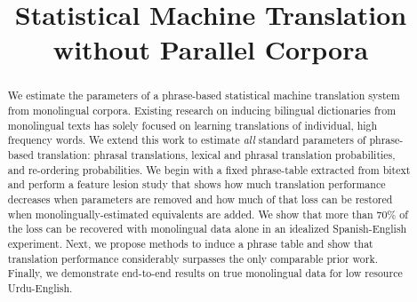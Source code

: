 \documentclass[11pt]{article}
\title{Statistical Machine Translation without Parallel Corpora}
\author{}
\date{}
\begin{document}
\maketitle
\begin{abstract}
We estimate the parameters of a phrase-based statistical machine translation system from monolingual corpora.  Existing research on inducing bilingual dictionaries from monolingual texts has solely focused on learning translations of individual, high frequency words.   We extend this work to estimate {\em all} standard parameters of phrase-based translation: phrasal translations, lexical and phrasal translation probabilities, and re-ordering probabilities.  We begin with a fixed phrase-table extracted from bitext and perform a feature lesion study that shows how much translation performance decreases when parameters are removed and how much of that loss can be restored when monolingually-estimated equivalents are added.  We show that more than 70\% of the loss can be recovered with monolingual data alone in an idealized Spanish-English experiment.  Next, we propose methods to induce a phrase table and show that translation performance considerably surpasses the only comparable prior work.  Finally, we demonstrate end-to-end results on true monolingual data for low resource Urdu-English.




\end{abstract}
\end{document}
